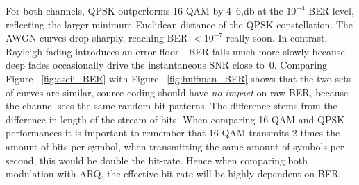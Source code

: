 For both channels, QPSK outperforms 16-QAM by 4–6,\si{\decibel} at the $10^{-4}$ BER level, reflecting the larger minimum Euclidean distance of the QPSK constellation. The AWGN curves drop sharply, reaching BER \(<10^{-7}\) really soon. In contrast, Rayleigh fading introduces an error floor—BER falls much more slowly because deep fades occasionally drive the instantaneous SNR close to~0. Comparing Figure ~\ref{fig:ascii_BER} with Figure ~\ref{fig:huffman_BER} shows that the two sets of curves are similar, source coding should have \emph{no impact} on raw BER, because the channel sees the same random bit patterns. The  difference stems from the difference in length of the stream of bits.
When comparing 16-QAM and QPSK performances it is important to remember that 16-QAM transmits 2 times the amount of bits per symbol, when transmitting the same amount of symbols per second, this would be double the bit-rate. Hence when comparing both modulation with ARQ, the effective bit-rate will be highly dependent on BER. 

